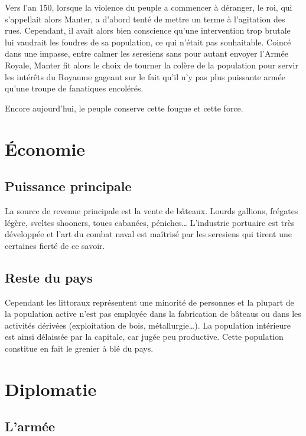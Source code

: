 \documentclass[french, a4paper, 12pt]{article}
\begin{document}
Vers l'an 150, lorsque la violence du peuple a commencer à déranger, le roi, qui s'appellait alors Manter, a d'abord tenté de mettre un terme à l'agitation des rues. Cependant, il avait alors bien conscience qu'une intervention trop brutale lui vaudrait les foudres de sa population, ce qui n'était pas souhaitable. Coincé dans une impasse, entre calmer les seresiens sans pour autant envoyer l'Armée Royale, Manter fit alors le choix de tourner la colère de la population pour servir les intérêts du Royaume gageant sur le fait qu'il n'y pas plus puissante armée qu'une troupe de fanatiques encolérés.

Encore aujourd'hui, le peuple conserve cette fougue et cette force.

\section{Économie}

\subsection{Puissance principale}

La source de revenue principale est la vente de bâteaux. Lourds gallions, frégates légère, sveltes shooners, toues cabanées, péniches… L'industrie portuaire est très développée et l'art du combat naval est maîtrisé par les seresiens qui tirent une certaines fierté de ce savoir.

\subsection{Reste du pays}

Cependant les littoraux représentent une minorité de personnes et la plupart de la population active n'est pas employée dans la fabrication de bâteaus ou dans les activités dérivées (exploitation de bois, métallurgie…). La population intérieure est ainsi délaissée par la capitale, car jugée peu productive. Cette population constitue en fait le grenier à blé du pays.

\section{Diplomatie}

\subsection{L'armée}
\end{document}
